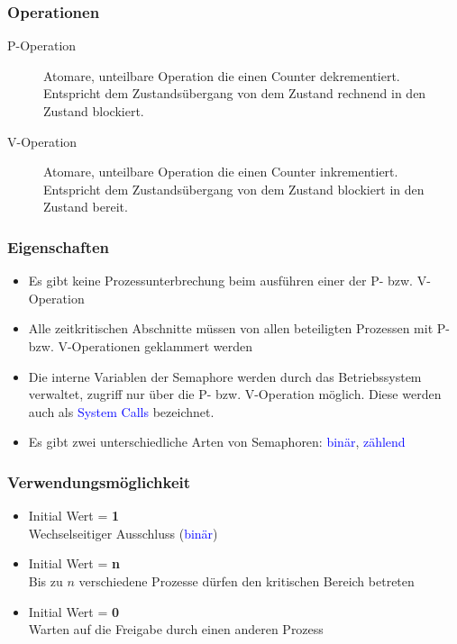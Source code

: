 \documentclass[10pt,a4paper]{article}
\begin{document}
\begin{multicols*}{4}
\subsubsection*{Operationen}
\begin{description}
	\item[P-Operation] Atomare, unteilbare Operation die einen Counter dekrementiert. \\
	      Entspricht dem Zustandsübergang von dem Zustand rechnend in den Zustand blockiert.
	\item[V-Operation] Atomare, unteilbare Operation die einen Counter inkrementiert. \\
	      Entspricht dem Zustandsübergang von dem Zustand blockiert in den Zustand bereit.
\end{description}

\subsubsection*{Eigenschaften}
\begin{itemize}
	\item Es gibt keine Prozessunterbrechung beim ausführen einer der P- bzw. V-Operation
	\item Alle zeitkritischen Abschnitte müssen von allen beteiligten Prozessen mit P- bzw. V-Operationen geklammert
	      werden
	\item Die interne Variablen der Semaphore werden durch das Betriebssystem verwaltet, zugriff nur über die
	      P- bzw. V-Operation möglich. Diese werden auch als \textcolor{blue}{System Calls} bezeichnet.
	\item Es gibt zwei unterschiedliche Arten von Semaphoren: \textcolor{blue}{binär}, \textcolor{blue}{zählend}
\end{itemize}
\subsubsection*{Verwendungsmöglichkeit}
\begin{itemize}
	\item Initial Wert = \textbf{1}\\
	      Wechselseitiger Ausschluss (\textcolor{blue}{binär})
	\item Initial Wert = \textbf{n}\\
	      Bis zu \(n\) verschiedene Prozesse dürfen den kritischen Bereich betreten
	\item Initial Wert = \textbf{0}\\
	      Warten auf die Freigabe durch einen anderen Prozess
\end{itemize}

\end{multicols*}
\end{document}
